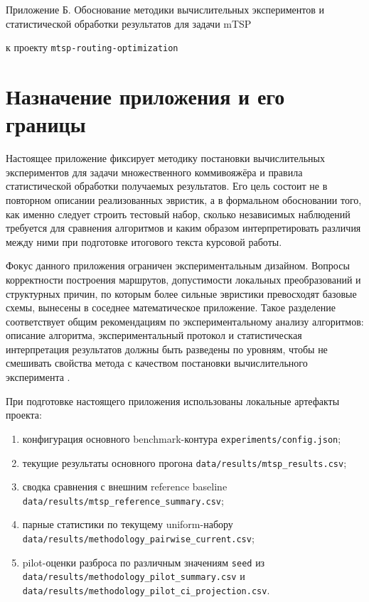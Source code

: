 \begin{refsection}

\begin{center}
{\Large Приложение Б. Обоснование методики вычислительных экспериментов и статистической обработки результатов для задачи mTSP}

\vspace{0.5em}
{\large к проекту \texttt{mtsp-routing-optimization}}
\end{center}

\vspace{1em}

\section{Назначение приложения и его границы}

Настоящее приложение фиксирует методику постановки вычислительных экспериментов для задачи множественного коммивояжёра и правила статистической обработки получаемых результатов. Его цель состоит не в повторном описании реализованных эвристик, а в формальном обосновании того, как именно следует строить тестовый набор, сколько независимых наблюдений требуется для сравнения алгоритмов и каким образом интерпретировать различия между ними при подготовке итогового текста курсовой работы.

Фокус данного приложения ограничен экспериментальным дизайном. Вопросы корректности построения маршрутов, допустимости локальных преобразований и структурных причин, по которым более сильные эвристики превосходят базовые схемы, вынесены в соседнее математическое приложение. Такое разделение соответствует общим рекомендациям по экспериментальному анализу алгоритмов: описание алгоритма, экспериментальный протокол и статистическая интерпретация результатов должны быть разведены по уровням, чтобы не смешивать свойства метода с качеством постановки вычислительного эксперимента \cite{johnson1999,hooker1995}.

При подготовке настоящего приложения использованы локальные артефакты проекта:
\begin{enumerate}[label=\arabic*.]
  \item конфигурация основного benchmark-контура \texttt{experiments/config.json};
  \item текущие результаты основного прогона \texttt{data/results/mtsp\_results.csv};
  \item сводка сравнения с внешним reference baseline \texttt{data/results/mtsp\_reference\_summary.csv};
  \item парные статистики по текущему uniform-набору \texttt{data/results/methodology\_pairwise\_current.csv};
  \item pilot-оценки разброса по различным значениям \texttt{seed} из \texttt{data/results/methodology\_pilot\_summary.csv} и \texttt{data/results/methodology\_pilot\_ci\_projection.csv}.
\end{enumerate}


\end{refsection}
